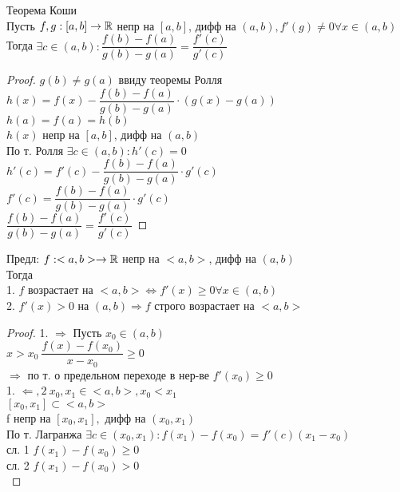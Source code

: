 \begin{theorem}
	Теорема Коши \\
	Пусть $  f,g : [a, b] \rightarrow \mathbb{R} $ непр на $ [a, b] $, дифф на $ (a, b), f'(g) \neq 0 \forall x \in (a, b) $ \\ 
	Тогда $ \exists c \in (a, b) : \dfrac{f(b) - f(a)}{g(b) - g(a)} = \dfrac{f'(c)}{g'(c)} $ \\
	\begin{proof}
		$ g(b) \neq g(a) $ ввиду теоремы Ролля \\
		$ h(x) = f(x) - \dfrac{f(b) - f(a)}{g(b) - g(a)} \cdot (g(x) - g(a)) $ \\
		$ h(a) = f(a) = h(b) $\\
		$ h(x) $ непр на $ [a, b] $, дифф на $ (a, b) $ \\ 
		По т. Ролля $ \exists c \in (a, b) : h'(c) = 0 $ \\
		$ h'(c) = f'(c) - \dfrac{f(b) - f(a)}{g(b) - g(a)} \cdot g'(c)  $ \\
		$ f'(c) = \dfrac{f(b) - f(a)}{g(b) - g(a)} \cdot g'(c) $ \\
		$ \dfrac{f(b) - f(a)}{g(b) - g(a)} = \dfrac{f'(c)}{g'(c)} $
	\end{proof}
\end{theorem}
Предл:  $ f : <a, b> \rightarrow \mathbb{R} $ непр на $ <a, b> $, дифф на $ (a, b) $ \\
Тогда \\
1. $ f $ возрастает на $ <a, b> \Leftrightarrow f'(x) \geq 0 \forall x \in (a, b) $ \\
2. $ f'(x) > 0 $ на $ (a, b) \Rightarrow f $ строго возрастает на $ <a, b> $ \\
\begin{proof}
	1. $ \Rightarrow $ Пусть $ x_0 \in (a, b) $ \\
	$ x > x_0 \ \dfrac{f(x) - f(x_0)}{x - x_0} \geq 0 $\\
	$ \Rightarrow $ по т. о предельном переходе в нер-ве $ f'(x_0) \geq 0 $ \\
	1. $ \Leftarrow, 2 \ x_0, x_1 \in <a,b> , x_0 < x_1 $ \\
	$ [x_0, x_1] \subset <a,b> $ \\
	f непр на $ [x_0, x_1], $ дифф на $ (x_0, x_1) $ \\
	По т. Лагранжа $ \exists c \in (x_0, x_1) : f(x_1) - f(x_0) = f'(c) (x_1 - x_0) $ \\
	сл. 1 $ f(x_1) - f(x_0) \geq 0 $ \\ 
	сл. 2 $ f(x_1) - f(x_0) > 0 $ \\ 
\end{proof}

